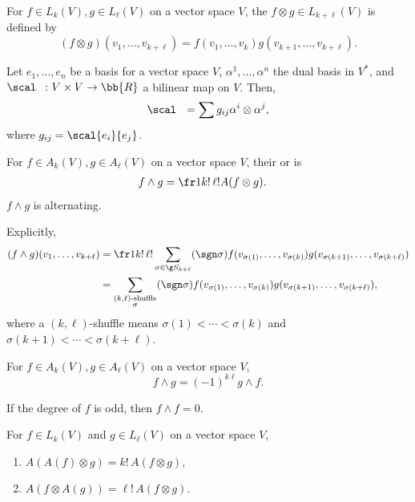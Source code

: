 For $f \in L_k(V), g \in L_\ell(V)$ on a vector space $V$, the  $f \otimes g \in L_{k+\ell}(V)$ is defined by
\[
(f \otimes g) (v_1, \dotsc, v_{k+\ell}) = f(v_1,\dotsc,v_k)g(v_{k+1},\dotsc,v_{k+\ell}).
\]

Let $e_1,\dotsc,e_n$ be a basis for a vector space $V$, $\alpha^1,\dotsc,\alpha^n$ the dual basis in $V^*$, and $\scal\ \  \colon V \times V \to \bb{R}$ a bilinear map on $V$. Then,
\[
\scal\ \  = \sum g_{ij} \alpha^i \otimes \alpha^j,
\]
where $g_{ij} = \scal{e_i}{e_j}$.

For $f \in A_k(V), g \in A_\ell(V)$ on a vector space $V$, their  or  is
\begin{align*}
f \wedge g &= \fr1{k!\, \ell!} A( f \otimes g).
\end{align*}
$f \wedge g$ is alternating.

Explicitly,
\begin{align*}
(f \wedge g) (v_1,\dotsc,v_{k+\ell}) &= \fr1{k!\,\ell!} \sum_{\sigma \in \g S_{k+\ell}} (\sgn \sigma)f(v_{\sigma(1)},\dotsc,v_{\sigma(k)}) g(v_{\sigma(k+1)},\dotsc,v_{\sigma(k+\ell)}) \\
&= \sum_{\substack{(k,\ell)\text{-shuffle}\\ \sigma}} (\sgn \sigma) f(v_{\sigma(1)},\dotsc,v_{\sigma(k)}) g(v_{\sigma(k+1)},\dotsc,v_{\sigma(k+\ell)}),
\end{align*}
where a $(k,\ell)$-shuffle means $\sigma(1)<\dotsb<\sigma(k)$ and $\sigma(k+1)<\dotsb < \sigma(k+\ell)$.

For $f \in A_k (V), g \in A_\ell(V)$ on a vector space $V$,
\[
f \wedge g = (-1)^{k\ell} g \wedge f.
\]

If the degree of $f$ is odd, then $f \wedge f = 0$.

For $f \in L_k(V)$ and $g \in L_\ell(V)$ on a vector space $V$,
\begin{enumerate}
\item $A(A(f)\otimes g) = k!\,A(f\otimes g)$,
\item $A(f\otimes A(g)) = \ell!\,A(f\otimes g)$.
\end{enumerate}

